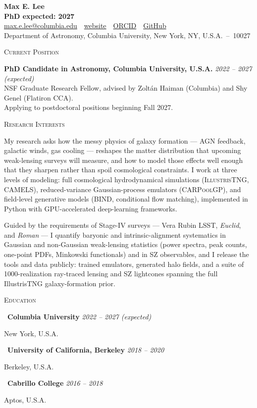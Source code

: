 \documentclass[11pt,letterpaper]{article}
\newcommand{\cvsection}[1]{%
  \vspace{1.05em}%
  {\color{head}\large\scshape #1}\par
  \vspace{-0.5em}{\color{rulec}\rule{\linewidth}{1.1pt}}\par
  \vspace{0.15em}%
}
\newcommand{\entry}[4]{%
  \textbullet~\textbf{#1} \hfill {\itshape #2}\par
  \hspace*{1.05em}{\itshape #3} \hfill #4\par
  \vspace{0.25em}%
}
\begin{document}
\begin{center}
  {\Huge\bfseries Max E. Lee}\\[0.35em]
  {\bfseries PhD expected: 2027}\\[0.3em]
  \href{mailto:max.e.lee@columbia.edu}{max.e.lee@columbia.edu} \,\textbar\,
  \href{https://maxelee.github.io}{website} \,\textbar\,
  \href{https://orcid.org/0000-0002-2318-3087}{ORCID} \,\textbar\,
  \href{https://github.com/Maxelee}{GitHub}\\[0.3em]
  Department of Astronomy, Columbia University, New York, NY, U.S.A.~--~10027
\end{center}

\cvsection{Current Position}
\textbf{PhD Candidate in Astronomy, Columbia University, U.S.A.} \hfill {\itshape 2022 -- 2027 (expected)}\\
NSF Graduate Research Fellow, advised by Zolt\'an Haiman (Columbia) and Shy Genel (Flatiron CCA).\\
{\color{faint}\small Applying to postdoctoral positions beginning Fall 2027.}

\cvsection{Research Interests}
My research asks how the messy physics of galaxy formation --- AGN feedback, galactic winds, gas
cooling --- reshapes the matter distribution that upcoming weak-lensing surveys will measure, and how
to model those effects well enough that they sharpen rather than spoil cosmological constraints. I work
at three levels of modeling: full cosmological hydrodynamical simulations (\textsc{IllustrisTNG},
\textsc{CAMELS}), reduced-variance Gaussian-process emulators (\textsc{CARPoolGP}), and field-level
generative models (\textsc{BIND}, conditional flow matching), implemented in Python with
GPU-accelerated deep-learning frameworks.

Guided by the requirements of Stage-IV surveys --- Vera Rubin LSST, \textit{Euclid}, and
\textit{Roman} --- I quantify baryonic and intrinsic-alignment systematics in Gaussian and
non-Gaussian weak-lensing statistics (power spectra, peak counts, one-point PDFs, Minkowski
functionals) and in SZ observables, and I release the tools and data publicly: trained emulators,
generated halo fields, and a suite of 1000-realization ray-traced lensing and SZ lightcones spanning
the full IllustrisTNG galaxy-formation prior.

\cvsection{Education}
\entry{Columbia University}{2022 -- 2027 (expected)}{PhD in Astronomy; M.S. in Astronomy, 2024}{New York, U.S.A.}
\entry{University of California, Berkeley}{2018 -- 2020}{B.A. in Astronomy \& Physics}{Berkeley, U.S.A.}
\entry{Cabrillo College}{2016 -- 2018}{A.A. in Mathematics \& History}{Aptos, U.S.A.}
\end{document}
